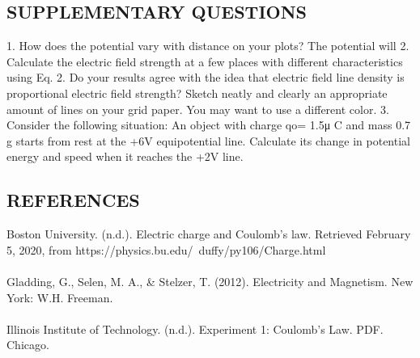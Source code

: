 \documentclass [12pt, letterpaper, twoside] {article}
\begin{document}
\subsection* {SUPPLEMENTARY QUESTIONS}
1. How does the potential vary with distance on your plots?
The potential will 
2. Calculate the electric field strength at a few places with different characteristics using Eq. 2. Do your results agree with the idea that electric field line density is proportional electric field strength? Sketch neatly and clearly an appropriate amount of lines on your grid paper. You may want to use a different color.
3. Consider the following situation: An object with charge qo= 1.5μ C and mass 0.7 g starts from rest at the +6V equipotential line. Calculate its change in potential energy and speed when it reaches the +2V line.

\subsection* {REFERENCES}
Boston University. (n.d.). Electric charge and Coulomb's law. Retrieved February 5, 2020, from https://physics.bu.edu/~duffy/py106/Charge.html \\\\
Gladding, G., Selen, M. A., \& Stelzer, T. (2012). Electricity and Magnetism. New York: W.H. Freeman. \\\\
Illinois Institute of Technology. (n.d.). Experiment 1: Coulomb's Law. PDF. Chicago.
\end{document}
